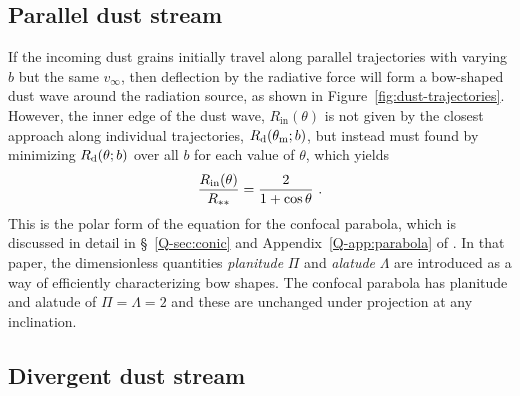 \subsection{Parallel dust stream}
\label{sec:dust-parallel}

If the incoming dust grains initially travel along parallel
trajectories with varying \(b\) but the same \(v_\infty\), then deflection
by the radiative force will form a bow-shaped dust wave around the
radiation source, as shown in Figure~\ref{fig:dust-trajectories}.
However, the inner edge of the dust wave, \(R_{\text{in}}(\theta)\) is not
given by the closest approach along individual trajectories,
\(R_{\text{d}}(\theta_{\text{m}}; b)\), but instead must found by minimizing
\(R_{\text{d}}(\theta; b)\) over all \(b\) for each value of \(\theta\), which yields
\begin{equation}
  \label{eq:dust-r-in}
  \frac{R_{\text{in}}(\theta)} {R\starstar} = \frac{2}{1 + \cos\theta} \ .
\end{equation}
This is the polar form of the equation for the confocal parabola,
which is discussed in detail in \S~\ref{Q-sec:conic} and
Appendix~\ref{Q-app:parabola} of \citet{Tarango-Yong:2018a}.  In that
paper, the dimensionless quantities \textit{planitude} \(\Pi\) and
\textit{alatude} \(\Lambda\) are introduced as a way of efficiently
characterizing bow shapes.  The confocal parabola has planitude and
alatude of \(\Pi = \Lambda = 2\) and these are unchanged under projection at
any inclination.



\subsection{Divergent dust stream}
\label{sec:dust-divergent}

